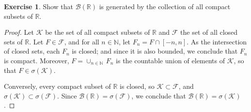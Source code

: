 \documentclass[11pt,a4paper,twoside]{article}
\theoremstyle{definition}
\newcounter{excounter}
\newtheorem{exercise}[excounter]{Exercise}
\begin{document}
\begin{exercise}

  Show that $\mathscr{B} ( \mathbb{R} )$ is generated by the collection of all compact subsets of $\mathbb{R}$.

\end{exercise}

\begin{proof}

  Let $\mathscr{K}$ be the set of all compact subsets of $\mathbb{R}$ and $\mathscr{F}$ the set of all closed sets of $\mathbb{R}$.
  Let $F \in \mathscr{F}$, and for all $n \in \mathbb{N}$, let $F_n = F \cap [ {-n}, n ]$. As the intersection of closed sets,
  each $F_n$ is closed; and since it is also bounded, we conclude that $F_n$ is compact.
  Moreover, $F = \cup_{n \in \mathbb{N}} \,F_n$ is the countable union of elements of $\mathscr{K}$, so that $F \in \sigma ( \mathscr{K} )$.

  Conversely, every compact subset of $\mathbb{R}$ is closed, so $\mathscr{K} \subset \mathscr{F}$, and
  $\sigma ( \mathscr{K} ) \subset \sigma ( \mathscr{F} )$. Since $\mathscr{B} ( \mathbb{R} ) = \sigma ( \mathscr{F} )$,
  we conclude that $\mathscr{B} ( \mathbb{R} ) = \sigma ( \mathscr{K} )$.

\end{proof}
\end{document}
